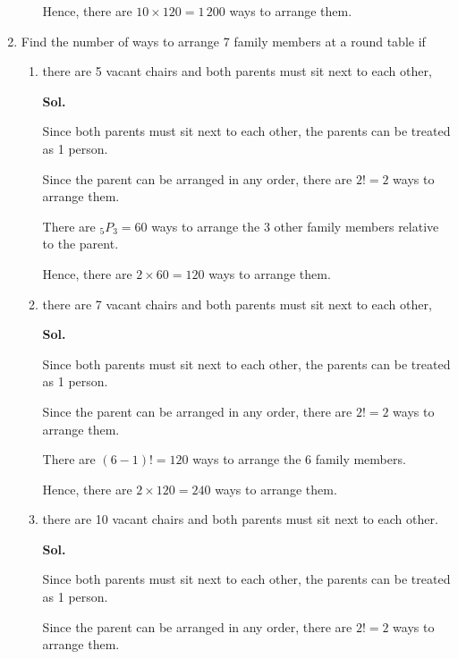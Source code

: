 \documentclass{report}
\newcommand\permtwo[2][^n]{{}_{#1}P_{#2}}
\newcommand{\sol}[1]{

      \noindent \textbf{Sol.}
}
\def\eos{\quad\hbox{\rlap{\hbox{\vrule depth 1.5pt height 2.6mm width 0.2mm \hskip 1mm \vrule height 2.6mm width 0.2mm}}{\vbox{\hrule height 0.2mm width 1.4mm \vskip 2.8mm \hrule depth 1.5pt height -0.35mm width 1.2mm}}}}
\begin{document}
\begin{multicols*}{2}
\begin{enumerate}
\begin{enumerate}
                              Hence, there are $10 \times 120 = 1\,200$ ways to arrange them. $\eos$
                  \end{enumerate}

            \item Find the number of ways to arrange 7 family members at a round table if
                  \begin{enumerate}
                        \item there are 5 vacant chairs and both parents must sit next to each other, \sol{}

                              Since both parents must sit next to each other, the parents can be treated as 1
                              person.

                              Since the parent can be arranged in any order, there are $2! = 2$ ways to
                              arrange them.

                              There are $\permtwo[5]{3} = 60$ ways to arrange the 3 other family members
                              relative to the parent.

                              Hence, there are $2 \times 60 = 120$ ways to arrange them. $\eos$

                        \item there are 7 vacant chairs and both parents must sit next to each other, \sol{}

                              Since both parents must sit next to each other, the parents can be treated as 1
                              person.

                              Since the parent can be arranged in any order, there are $2! = 2$ ways to
                              arrange them.

                              There are $(6-1)! = 120$ ways to arrange the 6 family members.

                              Hence, there are $2 \times 120 = 240$ ways to arrange them. $\eos$

                        \item there are 10 vacant chairs and both parents must sit next to each other. \sol{}

                              Since both parents must sit next to each other, the parents can be treated as 1
                              person.

                              Since the parent can be arranged in any order, there are $2! = 2$ ways to
                              arrange them.


\end{enumerate}
\end{enumerate}
\end{multicols*}
\end{document}
